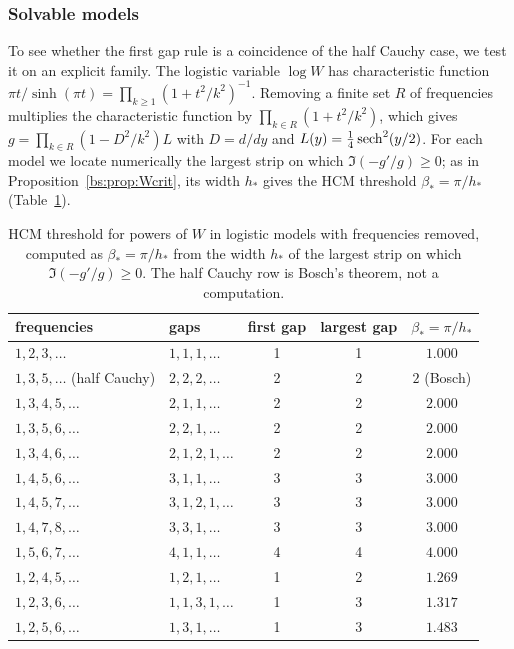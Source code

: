 \subsubsection{Solvable models}

To see whether the first gap rule is a coincidence of the half Cauchy case, we test it on an explicit family. The logistic variable $\log W$ has characteristic function $\pi t/\sinh(\pi t)=\prod_{k\ge1}(1+t^2/k^2)^{-1}$. Removing a finite set $R$ of frequencies multiplies the characteristic function by $\prod_{k\in R}(1+t^2/k^2)$, which gives $g=\prod_{k\in R}(1-D^2/k^2)L$ with $D=d/dy$ and $L(y)=\frac14\operatorname{sech}^2(y/2)$. For each model we locate numerically the largest strip on which $\Im(-g'/g)\ge0$; as in Proposition~\ref{bs:prop:Wcrit}, its width $h_*$ gives the HCM threshold $\beta_*=\pi/h_*$ (Table~\ref{bs:tab:gaps}).

\begin{table}[h]
\centering
\begin{tabular}{llccc}
\toprule
frequencies & gaps & first gap & largest gap & $\beta_*=\pi/h_*$\\
\midrule
$1,2,3,\ldots$ & $1,1,1,\ldots$ & 1 & 1 & $1.000$\\
$1,3,5,\ldots$ (half Cauchy) & $2,2,2,\ldots$ & 2 & 2 & $2$ (Bosch)\\
$1,3,4,5,\ldots$ & $2,1,1,\ldots$ & 2 & 2 & $2.000$\\
$1,3,5,6,\ldots$ & $2,2,1,\ldots$ & 2 & 2 & $2.000$\\
$1,3,4,6,\ldots$ & $2,1,2,1,\ldots$ & 2 & 2 & $2.000$\\
$1,4,5,6,\ldots$ & $3,1,1,\ldots$ & 3 & 3 & $3.000$\\
$1,4,5,7,\ldots$ & $3,1,2,1,\ldots$ & 3 & 3 & $3.000$\\
$1,4,7,8,\ldots$ & $3,3,1,\ldots$ & 3 & 3 & $3.000$\\
$1,5,6,7,\ldots$ & $4,1,1,\ldots$ & 4 & 4 & $4.000$\\
$1,2,4,5,\ldots$ & $1,2,1,\ldots$ & 1 & 2 & $1.269$\\
$1,2,3,6,\ldots$ & $1,1,3,1,\ldots$ & 1 & 3 & $1.317$\\
$1,2,5,6,\ldots$ & $1,3,1,\ldots$ & 1 & 3 & $1.483$\\
\bottomrule
\end{tabular}
\caption{HCM threshold for powers of $W$ in logistic models with frequencies removed, computed as $\beta_*=\pi/h_*$ from the width $h_*$ of the largest strip on which $\Im(-g'/g)\ge0$. The half Cauchy row is Bosch's theorem, not a computation.}
\label{bs:tab:gaps}
\end{table}


